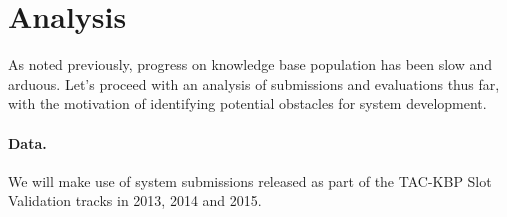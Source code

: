 \section{Analysis}
\label{sec:analysis}

As noted previously, progress on knowledge base population has been slow and arduous.
Let's proceed with an analysis of submissions and evaluations thus far, with the motivation of identifying potential obstacles for system development. 

\paragraph{Data.}
We will make use of system submissions released as part of the TAC-KBP Slot Validation tracks in 2013, 2014 and 2015.


